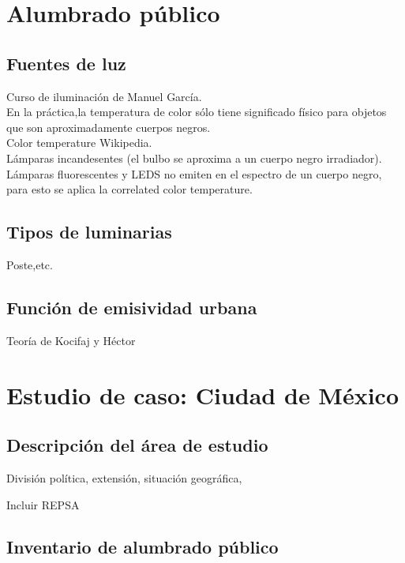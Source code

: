 \section{Alumbrado público}

\subsection{Fuentes de luz} \label{fuentesluz}

Curso de iluminación de Manuel García.\\

En la práctica,la temperatura de color sólo tiene significado físico para objetos que son aproximadamente cuerpos negros.\\

Color temperature Wikipedia.\\

Lámparas incandesentes (el bulbo se aproxima a un cuerpo negro irradiador). \\


Lámparas fluorescentes y LEDS no emiten en el espectro de un cuerpo negro, para esto se aplica la correlated color temperature.\\

\subsection{Tipos de luminarias}

Poste,etc.

\subsection{Función de emisividad urbana}

Teoría de Kocifaj y Héctor

\section{Estudio de caso: Ciudad de México}


\subsection{Descripción del área de estudio}

División política, extensión, situación geográfica, 

Incluir REPSA

\subsection{Inventario de alumbrado público}

